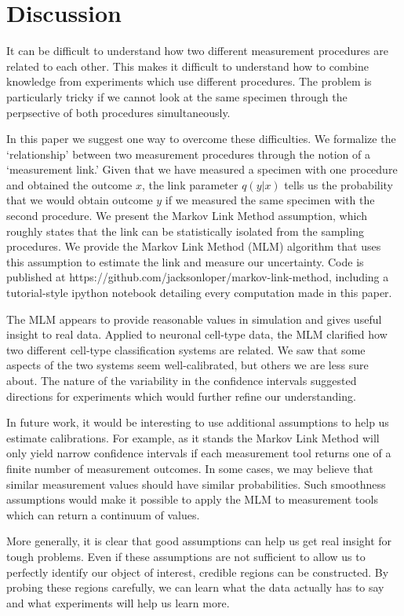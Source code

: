 \section{Discussion}

It can be difficult to understand how two different measurement procedures are related to each other.  This makes it difficult to understand how to combine knowledge from experiments which use different procedures.  The problem is particularly tricky if we cannot look at the same specimen through the perpsective of both procedures simultaneously.

In this paper we suggest one way to overcome these difficulties.  We formalize the `relationship' between two measurement procedures through the notion of a `measurement link.'  Given that we have measured a specimen with one procedure and obtained the outcome $x$, the link parameter $q(y|x)$ tells us the probability that we would obtain outcome $y$ if we measured the same specimen with the second procedure.  We present the Markov Link Method assumption, which roughly states that the link can be statistically isolated from the sampling procedures.  We provide the Markov Link Method (MLM) algorithm that uses this assumption to estimate the link and measure our uncertainty.  Code is published at https://github.com/jacksonloper/markov-link-method, including a tutorial-style ipython notebook detailing every computation made in this paper.

The MLM appears to provide reasonable values in simulation and gives useful insight to real data.  Applied to neuronal cell-type data, the MLM clarified how two different cell-type classification systems are related.  We saw that some aspects of the two systems seem well-calibrated, but others we are less sure about.  The nature of the variability in the confidence intervals suggested directions for experiments which would further refine our understanding.  

In future work, it would be interesting to use additional assumptions to help us estimate calibrations.  For example, as it stands the Markov Link Method will only yield narrow confidence intervals if each measurement tool returns one of a finite number of measurement outcomes.  In some cases, we may believe that similar measurement values should have similar probabilities.  Such smoothness assumptions would make it possible to apply the MLM to measurement tools which can return a continuum of values.   

More generally, it is clear that good assumptions can help us get real insight for tough problems. Even if these assumptions are not sufficient to allow us to perfectly identify our object of interest, credible regions can be constructed.  By probing these regions carefully, we can learn what the data actually has to say and what experiments will help us learn more.

